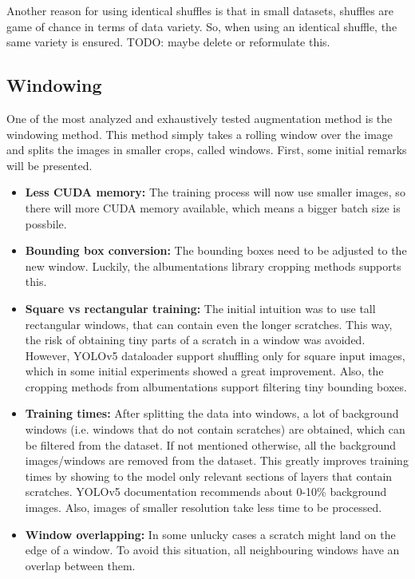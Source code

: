 Another reason for using identical shuffles is that in small datasets, shuffles are game of chance in terms of data variety. So, when using an identical shuffle, the same variety is ensured. TODO: maybe delete or reformulate this. \\


\subsection{Windowing}
One of the most analyzed and exhaustively tested augmentation method is the windowing method. This method simply takes a rolling window over the image and splits the images in smaller crops, called windows. First, some initial remarks will be presented.
\begin{itemize}
\item \textbf{Less CUDA memory:} The training process will now use smaller images, so there will more CUDA memory available, which means a bigger batch size is possbile.
\item \textbf{Bounding box conversion:} The bounding boxes need to be adjusted to the new window. Luckily, the albumentations library cropping methods supports this.
\item \textbf{Square vs rectangular training:} The initial intuition was to use tall rectangular windows, that can contain even the longer scratches. This way, the risk of obtaining tiny parts of a scratch in a window was avoided. However, YOLOv5 dataloader support shuffling only for square input images, which in some initial experiments showed a great improvement. Also, the cropping methods from albumentations support filtering tiny bounding boxes.
\item \textbf{Training times:} After splitting the data into windows, a lot of background windows (i.e. windows that do not contain scratches) are obtained, which can be filtered from the dataset. If not mentioned otherwise, all the background images/windows are removed from the dataset. This greatly improves training times by showing to the model only relevant sections of layers that contain scratches. YOLOv5 documentation recommends about 0-10\% background images. Also, images of smaller resolution take less time to be processed.
\item \textbf{Window overlapping:} In some unlucky cases a scratch might land on the edge of a window. To avoid this situation, all neighbouring windows have an overlap between them.
\end{itemize}

